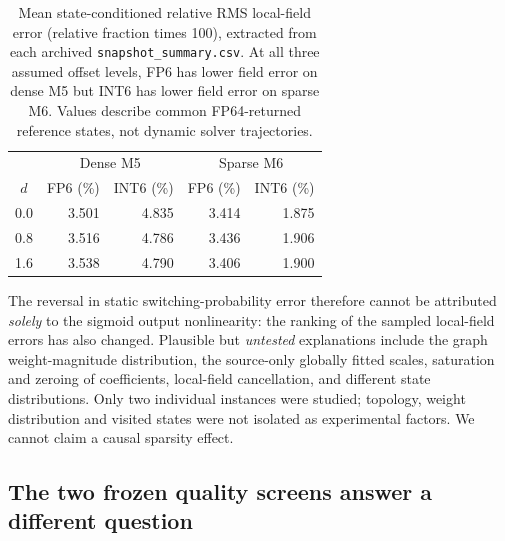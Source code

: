 \begin{table}[htbp]\centering\small
\begin{tabular}{@{}c rrrr@{}}\toprule
 & \multicolumn{2}{c}{Dense M5} & \multicolumn{2}{c}{Sparse M6}\\
$d$ & FP6 (\%) & INT6 (\%) & FP6 (\%) & INT6 (\%)\\\midrule
0.0 & 3.501 & 4.835 & 3.414 & 1.875\\
0.8 & 3.516 & 4.786 & 3.436 & 1.906\\
1.6 & 3.538 & 4.790 & 3.406 & 1.900\\\bottomrule
\end{tabular}
\caption{Mean state-conditioned relative RMS local-field error
(relative fraction times 100), extracted from each archived
\texttt{snapshot\_summary.csv}. At all three assumed offset
levels, FP6 has lower field error on dense M5 but INT6
has lower field error on sparse M6. Values describe
common FP64-returned reference states, not dynamic
solver trajectories.}
\label{tab:heldout-relativefield}
\end{table}

The reversal in static switching-probability error therefore
cannot be attributed \emph{solely} to the sigmoid output
nonlinearity: the ranking of the sampled local-field
errors has also changed. Plausible but \emph{untested}
explanations include the graph weight-magnitude distribution,
the source-only globally fitted scales, saturation and
zeroing of coefficients, local-field cancellation, and
different state distributions. Only two individual
instances were studied; topology, weight distribution
and visited states were not isolated as experimental
factors. We cannot claim a causal sparsity effect.

\subsection{The two frozen quality screens answer a different question}

